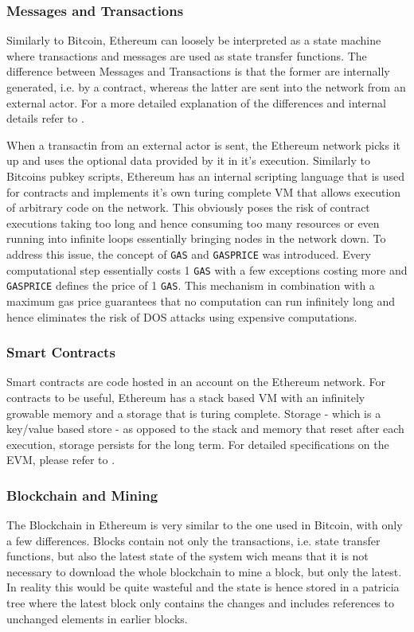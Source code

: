 \documentclass[12pt,msc,a4paper,oneside]{ucl_thesis}
\begin{document}
\subsubsection{Messages and Transactions}
Similarly to Bitcoin, Ethereum can loosely be interpreted as a state machine where transactions and messages are used as state transfer functions. The difference between Messages and Transactions is that the former are internally generated, i.e. by a contract, whereas the latter are sent into the network from an external actor. For a more detailed explanation of the differences and internal details refer to \cite{ethereum:gavin_wood}.

When a transactin from an external actor is sent, the Ethereum network picks it up and uses the optional data provided by it in it's execution. Similarly to Bitcoins pubkey scripts, Ethereum has an internal scripting language that is used for contracts and implements it's own turing complete VM that allows execution of arbitrary code on the network. This obviously poses the risk of contract executions taking too long and hence consuming too many resources or even running into infinite loops essentially bringing nodes in the network down. To address this issue, the concept of \texttt{GAS} and \texttt{GASPRICE} was introduced. Every computational step essentially costs 1 \texttt{GAS} with a few exceptions costing more and \texttt{GASPRICE} defines the price of 1 \texttt{GAS}. This mechanism in combination with a maximum gas price guarantees that no computation can run infinitely long and hence eliminates the risk of DOS attacks using expensive computations.

\subsubsection{Smart Contracts}
Smart contracts are code hosted in an account on the Ethereum network. For contracts to be useful, Ethereum has a stack based VM with an infinitely growable memory and a storage that is turing complete. Storage - which is a key/value based store - as opposed to the stack and memory that reset after each execution, storage persists for the long term. For detailed specifications on the EVM, please refer to \cite{ethereum:gavin_wood}.

\subsubsection{Blockchain and Mining}
The Blockchain in Ethereum is very similar to the one used in Bitcoin, with only a few differences. Blocks contain not only the transactions, i.e. state transfer functions, but also the latest state of the system wich means that it is not necessary to download the whole blockchain to mine a block, but only the latest. In reality this would be quite wasteful and the state is hence stored in a patricia tree where the latest block only contains the changes and includes references to unchanged elements in earlier blocks. 
\end{document}
